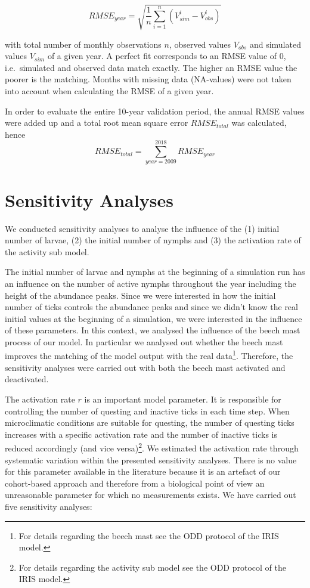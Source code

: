 \documentclass[a4paper, 11pt]{scrartcl}
\begin{document}
\begin{equation}\label{eq:rmse}
RMSE_{year} = \sqrt{ \frac{1}{n} \sum_{i=1}^n (V_{sim}^i - V_{obs}^i)}
\end{equation}

with total number of monthly observations $n$, observed values $V_{obs}$ and simulated values $V_{sim}$ of a given year. A perfect fit corresponds to an RMSE value of 0, i.e.\
simulated and observed data match exactly. The higher an RMSE value the poorer is the matching. Months with missing data (NA-values) were not taken into account when
calculating the RMSE of a given year.

In order to evaluate the entire 10-year validation period, the annual RMSE values were added up and a total root mean square error $RMSE_{total}$ was calculated, hence
\begin{equation}\label{eq:total_rmse}
RMSE_{total} = \sum_{year=2009}^{2018} RMSE_{year}
\end{equation}


\section{Sensitivity Analyses}
We conducted sensitivity analyses to analyse the influence of the (1) initial number of larvae, (2) the initial number of nymphs and (3) the activation rate of the activity sub
model.

The initial number of larvae and nymphs at the beginning of a simulation run has an influence on the number of active nymphs throughout the year including the height of the
abundance peaks. Since we were interested in how the initial number of ticks controls the abundance peaks and since we didn't know the real initial values at the beginning of a
simulation, we were interested in the influence of these parameters. In this context, we analysed the influence of the beech mast process of our model. In
particular we analysed out whether the beech mast improves the matching of the model output with the real data\footnote{For details regarding the beech mast
see the ODD protocol of the IRIS model.}. Therefore, the sensitivity analyses were carried out with both the beech mast activated and deactivated.

The activation rate $r$ is an important model parameter. It is responsible for controlling the number of questing and inactive ticks in each time step. When microclimatic
conditions are suitable for questing, the number of questing ticks increases with a specific activation rate and the number of inactive ticks is reduced accordingly (and vice
versa)\footnote{For details regarding the activity sub model see the ODD protocol of the IRIS model.}. We estimated the activation rate through systematic variation within the
presented sensitivity analyses. There is no value for this parameter available in the literature because it is an artefact of our cohort-based approach and
therefore from a biological point of view an unreasonable parameter for which no measurements exists. We have carried out five sensitivity analyses:
\end{document}
